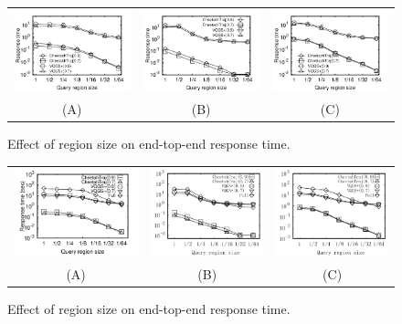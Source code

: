 \begin{figure}
	\centering
	\small
	\begin{tabular}{ccc}
		\includegraphics[width=0.22\linewidth]{pictures/quantitative_study/size_porto_t}
		&
		\includegraphics[width=0.22\linewidth]{pictures/quantitative_study/size_sz_t}
		&
		\includegraphics[width=0.22\linewidth]{pictures/quantitative_study/size_cd_t}
		\\
		(A) \pt{}
		&
		(B) \sz{}
		&
		(C) \cd{}
	\end{tabular}
    \trim
    \vspace{-2mm}
	\caption{Effect of region size on end-top-end response time.}
	\label{fig:size_responsetime}
	\trim \trim
\end{figure}
\fi

\begin{figure}
	\centering
	\small
	\begin{tabular}{ccc}
		\includegraphics[width=0.22\linewidth]{pictures/quantitative_study/regionsize_response_time/tporto}
		&
		\includegraphics[width=0.22\linewidth]{pictures/quantitative_study/regionsize_response_time/tshenzhen}
		&
		\includegraphics[width=0.22\linewidth]{pictures/quantitative_study/regionsize_response_time/tcd}
		\\
		(A) \pt{}
		&
		(B) \sz{}
		&
		(C) \cd{}
	\end{tabular}
	\trim
	\vspace{-2mm}
	\caption{Effect of region size on end-top-end response time.}
	\label{fig:size_responsetime}
	\trim \trim
\end{figure}


